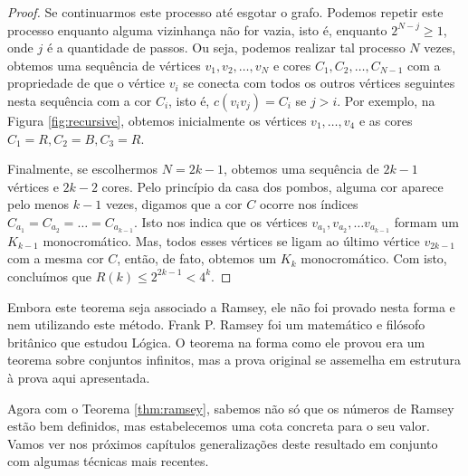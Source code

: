 \begin{proof}
Se continuarmos este processo até esgotar o grafo. Podemos repetir este processo enquanto alguma vizinhança não for vazia, isto é, enquanto $2^{N-j} \geq 1$, onde $j$ é a quantidade de passos. Ou seja, podemos realizar tal processo $N$ vezes, obtemos uma sequência de vértices $v_1, v_2, \dots, v_N$ e cores $C_1, C_2, \dots, C_{N-1}$ com a propriedade de que o vértice $v_i$ se conecta com todos os outros vértices seguintes nesta sequência com a cor $C_i$, isto é, $c(v_i v_j) = C_i$ se $j > i$. Por exemplo, na Figura \ref{fig:recursive}, obtemos inicialmente os vértices $v_1, \dots, v_4$ e as cores $C_1 = R, C_2 = B, C_3 = R$.

Finalmente, se escolhermos $N = 2k - 1$, obtemos uma sequência de $2k - 1$ vértices e $2k - 2$ cores. Pelo princípio da casa dos pombos, alguma cor aparece pelo menos $k-1$ vezes, digamos que a cor $C$ ocorre nos índices $C_{a_1} =  C_{a_2} = \dots = C_{a_{k-1}}$. Isto nos indica que os vértices $v_{a_1}, v_{a_2}, \dots v_{a_{k-1}}$ formam um $K_{k-1}$ monocromático. Mas, todos esses vértices se ligam ao último vértice $v_{2k - 1}$ com a mesma cor $C$, então, de fato, obtemos um $K_k$ monocromático. Com isto, concluímos que $R(k) \leq 2^{2k - 1} < 4^k$.
\end{proof}

Embora este teorema seja associado a Ramsey, ele não foi provado nesta forma e nem utilizando este método. Frank P. Ramsey foi um matemático e filósofo britânico que estudou Lógica. O teorema na forma como ele provou \cite{ramsey} era um teorema sobre conjuntos infinitos, mas a prova original se assemelha em estrutura à prova aqui apresentada.

Agora com o Teorema \ref{thm:ramsey}, sabemos não só que os números de Ramsey estão bem definidos, mas estabelecemos uma cota concreta para o seu valor. Vamos ver nos próximos capítulos generalizações deste resultado em conjunto com algumas técnicas mais recentes.


